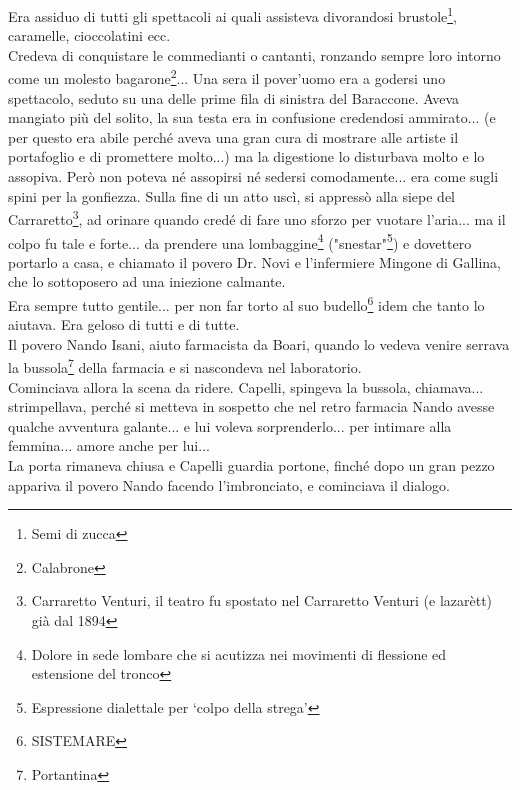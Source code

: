 Era assiduo di tutti gli spettacoli ai quali assisteva divorandosi brustole\footnote{Semi di zucca}, caramelle, cioccolatini ecc.\\
Credeva di conquistare le commedianti o cantanti, ronzando sempre loro intorno come un molesto bagarone\footnote{Calabrone}... Una sera il pover'uomo era a godersi uno spettacolo, seduto su una delle prime fila di sinistra del Baraccone. Aveva mangiato più del solito, la sua testa era in confusione credendosi ammirato... (e per questo era abile perché aveva una gran cura di mostrare alle artiste il portafoglio e di promettere molto...) ma la digestione lo disturbava molto e lo assopiva. Però non poteva né assopirsi né sedersi comodamente... era come sugli spini per la gonfiezza. Sulla fine di un atto uscì, si appressò alla siepe del Carraretto\footnote{Carraretto Venturi, il teatro fu spostato nel Carraretto Venturi (e lazarètt) già dal 1894}, ad orinare quando credé di fare uno sforzo per vuotare l'aria... ma il colpo fu tale e forte... da prendere una lombaggine\footnote{Dolore in sede lombare che si acutizza nei movimenti di flessione ed estensione del tronco} ("snestar"\footnote{Espressione dialettale per `colpo della strega'}) e dovettero portarlo a casa, e chiamato il povero Dr. Novi e l'infermiere Mingone di Gallina, che lo sottoposero ad una iniezione calmante. \\
Era sempre tutto gentile... per non far torto al suo budello\footnote{SISTEMARE} idem che tanto lo aiutava. Era geloso di tutti e di tutte.\\
Il povero Nando Isani, aiuto farmacista da Boari, quando lo vedeva venire serrava la bussola\footnote{Portantina} della farmacia e si nascondeva nel laboratorio.\\
Cominciava allora la scena da ridere. Capelli, spingeva la bussola, chiamava... strimpellava, perché si metteva in sospetto che nel retro farmacia Nando  avesse qualche avventura galante... e lui voleva sorprenderlo... per intimare alla femmina... amore anche per lui... \\
La porta rimaneva chiusa e Capelli guardia portone, finché dopo un gran pezzo appariva il povero Nando  facendo l'imbronciato, e cominciava il dialogo.\\
